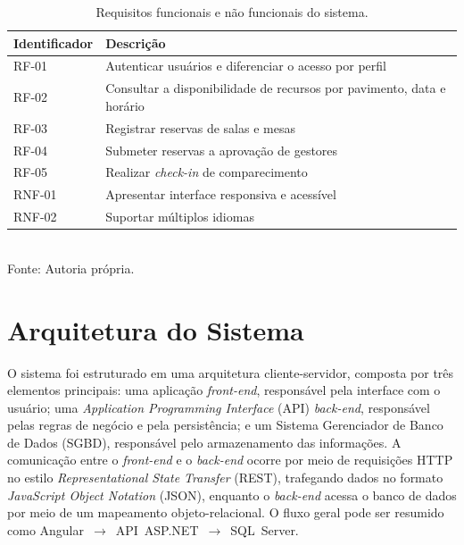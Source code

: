 \begin{table}[H]
  \centering
  \caption{Requisitos funcionais e não funcionais do sistema.}
  \label{quadro:requisitos}
  \begin{tabular}{|p{2.2cm}|p{9.5cm}|}
    \hline
    \textbf{Identificador} & \textbf{Descrição} \\
    \hline
    RF-01 & Autenticar usuários e diferenciar o acesso por perfil \\
    \hline
    RF-02 & Consultar a disponibilidade de recursos por pavimento, data e horário \\
    \hline
    RF-03 & Registrar reservas de salas e mesas \\
    \hline
    RF-04 & Submeter reservas a aprovação de gestores \\
    \hline
    RF-05 & Realizar \textit{check-in} de comparecimento \\
    \hline
    RNF-01 & Apresentar interface responsiva e acessível \\
    \hline
    RNF-02 & Suportar múltiplos idiomas \\
    \hline
  \end{tabular}\\
  {\footnotesize Fonte: Autoria própria.}
\end{table}

\section{Arquitetura do Sistema}\label{sec:arquitetura}

O sistema foi estruturado em uma arquitetura cliente-servidor, composta por três elementos principais: uma aplicação \textit{front-end}, responsável pela interface com o usuário; uma \textit{Application Programming Interface} (API) \textit{back-end}, responsável pelas regras de negócio e pela persistência; e um Sistema Gerenciador de Banco de Dados (SGBD), responsável pelo armazenamento das informações. A comunicação entre o \textit{front-end} e o \textit{back-end} ocorre por meio de requisições HTTP no estilo \textit{Representational State Transfer} (REST), trafegando dados no formato \textit{JavaScript Object Notation} (JSON), enquanto o \textit{back-end} acessa o banco de dados por meio de um mapeamento objeto-relacional. O fluxo geral pode ser resumido como Angular~$\rightarrow$~API~ASP.NET~$\rightarrow$~SQL~Server.

